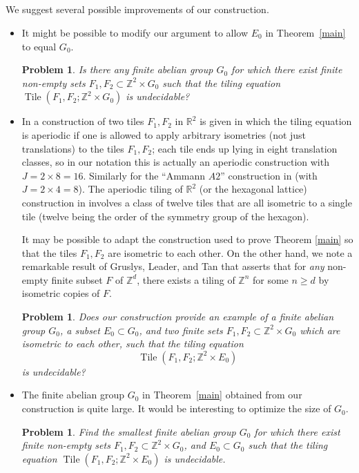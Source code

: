 \documentclass[reqno,a4paper,12pt]{amsart}
\numberwithin{equation}{section}
\numberwithin{figure}{section}
\def\R{\mathbb{R}}
\def\Z{\mathbb{Z}}
\renewcommand\geq{\geqslant}
\newcommand{\Tile}{\operatorname{Tile}}
\theoremstyle{plain}
\newtheorem{problem}[thm]{Problem}
\theoremstyle{definition}
\newcommand{\thmref}[1]{Theorem~\ref{#1}}
\begin{document}
\subsection{}
We suggest several possible improvements of our construction.
\begin{itemize}
    \item It might be possible to modify our argument to allow $E_0$ in \thmref{main} to equal $G_0$.  
\begin{problem}
Is there any finite abelian group $G_0$ for which there exist finite non-empty sets $F_1,F_2\subset \Z^2\times G_0$ such that the tiling equation $\Tile(F_1,F_2;\Z^2\times G_0)$ is undecidable?
\end{problem}

\item In \cite{goodman} a construction of two tiles $F_1,F_2$ in $\R^2$ is given in which the tiling equation is aperiodic if one is allowed to apply arbitrary isometries (not just translations) to the tiles $F_1,F_2$; each tile ends up lying in eight translation classes, so in our notation this is actually an aperiodic construction with $J = 2 \times 8 = 16$.  Similarly for the ``Ammann $A2$'' construction in \cite{ags} (with $J = 2 \times 4 = 8$). The aperiodic tiling of $\R^2$ (or the hexagonal lattice) construction in \cite{socolar-taylor} involves a class of twelve tiles that are all isometric to a single tile (twelve being the order of the symmetry group of the hexagon).

It may be possible to adapt the construction used to prove Theorem \ref{main} so that the tiles $F_1,F_2$ are isometric to each other.  On the other hand, we note a remarkable result of Gruslys, Leader, and Tan \cite{glt} that asserts that for \emph{any} non-empty finite subset $F$ of $\Z^d$, there exists a tiling of $\Z^n$ for some $n \geq d$ by isometric copies of $F$.

\begin{problem}
Does our construction provide an example of a finite abelian group  $G_0$, a subset $E_0\subset G_0$, and two finite sets $F_1,F_2 \subset \Z^2\times G_0$ which are isometric to each other, such that the tiling equation 
$$\Tile(F_1,F_2;\Z^2\times E_0)$$ 
is undecidable?
\end{problem}


\item The finite abelian group $G_0$ in \thmref{main} obtained from our construction is quite large.  
It would be interesting to optimize the size of $G_0$.
\begin{problem}
Find the smallest finite abelian group $G_0$ for which there exist finite non-empty sets $F_1,F_2\subset \Z^2\times G_0$, and  $E_0\subset G_0$ such that the tiling equation $\Tile(F_1,F_2;\Z^2\times E_0)$ is undecidable.
\end{problem}


\end{itemize}
\end{document}
